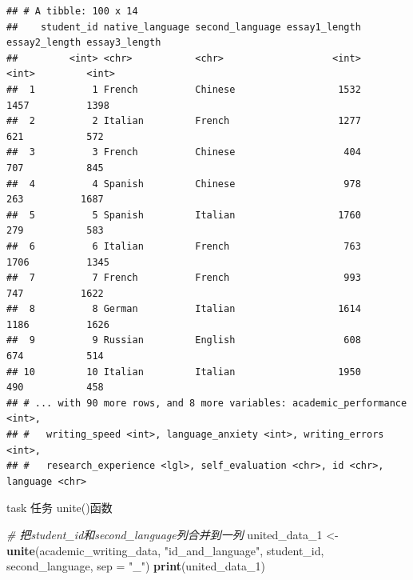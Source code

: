 \documentclass[]{book}
\newenvironment{Shaded}{\begin{snugshade}}{\end{snugshade}}
\newcommand{\CommentTok}[1]{\textcolor[rgb]{0.56,0.35,0.01}{\textit{#1}}}
\newcommand{\DataTypeTok}[1]{\textcolor[rgb]{0.13,0.29,0.53}{#1}}
\newcommand{\DecValTok}[1]{\textcolor[rgb]{0.00,0.00,0.81}{#1}}
\newcommand{\KeywordTok}[1]{\textcolor[rgb]{0.13,0.29,0.53}{\textbf{#1}}}
\newcommand{\NormalTok}[1]{#1}
\newcommand{\StringTok}[1]{\textcolor[rgb]{0.31,0.60,0.02}{#1}}
\begin{document}
\begin{verbatim}
## # A tibble: 100 x 14
##    student_id native_language second_language essay1_length essay2_length essay3_length
##         <int> <chr>           <chr>                   <int>         <int>         <int>
##  1          1 French          Chinese                  1532          1457          1398
##  2          2 Italian         French                   1277           621           572
##  3          3 French          Chinese                   404           707           845
##  4          4 Spanish         Chinese                   978           263          1687
##  5          5 Spanish         Italian                  1760           279           583
##  6          6 Italian         French                    763          1706          1345
##  7          7 French          French                    993           747          1622
##  8          8 German          Italian                  1614          1186          1626
##  9          9 Russian         English                   608           674           514
## 10         10 Italian         Italian                  1950           490           458
## # ... with 90 more rows, and 8 more variables: academic_performance <int>,
## #   writing_speed <int>, language_anxiety <int>, writing_errors <int>,
## #   research_experience <lgl>, self_evaluation <chr>, id <chr>, language <chr>
\end{verbatim}

\begin{infobox}task
任务 unite()函数

\end{infobox}

\begin{Shaded}
\begin{Highlighting}[]
\CommentTok{# 把student_id和second_language列合并到一列}
\NormalTok{united_data_}\DecValTok{1}\NormalTok{ <-}\StringTok{ }\KeywordTok{unite}\NormalTok{(academic_writing_data, }\StringTok{"id_and_language"}\NormalTok{, student_id, second_language, }\DataTypeTok{sep =} \StringTok{"_"}\NormalTok{)}
\KeywordTok{print}\NormalTok{(united_data_}\DecValTok{1}\NormalTok{)}
\end{Highlighting}
\end{Shaded}
\end{document}
